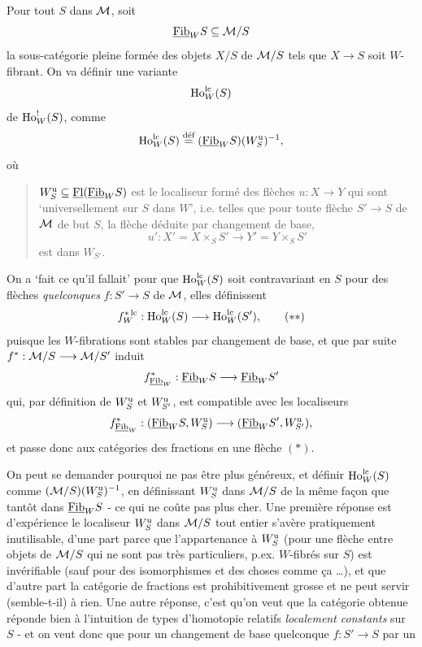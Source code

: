 Pour tout $S$ dans $\mathcal{M}$, soit
\[
\underline{\mathrm{Fib}}_W S \subseteq \mathcal{M}/S
\]
la sous-catégorie pleine formée des objets $X/S$ de $\mathcal{M}/S$ tels que $X \longrightarrow S$ soit $W$-fibrant. On va définir une variante
\[
\mathrm{Ho}^{\mathrm{lc}}_W(S)
\]
de $\mathrm{Ho}^!_W(S)$, comme
\[
\mathrm{Ho}^{\mathrm{lc}}_W(S) \overset{\text{déf}}{=} (\underline{\mathrm{Fib}}_W S)(W^{\mathrm{u}}_S)^{-1},
\]
où

\begin{quote}
$W^{\mathrm{u}}_S \subseteq \underline{\mathrm{Fl}}(\underline{\mathrm{Fib}}_W S)$ est le localiseur formé des flèches $u : X \longrightarrow Y$ qui sont ‘universellement sur $S$ dans $W$’, i.e. telles que pour toute flèche $S' \longrightarrow S$ de $\mathcal{M}$ de but $S$, la flèche déduite par changement de base,
\[
u' : X' = X \times_S S' \longrightarrow Y' = Y \times_S S'
\]
est dans $W_{S'}$.
\end{quote}

On a ‘fait ce qu'il fallait’ pour que $\mathrm{Ho}^{\mathrm{lc}}_W(S)$ soit contravariant en $S$ pour des flèches \textit{quelconques} $f : S' \longrightarrow S$ de $\mathcal{M}$, elles définissent
\[
f^{*\,\mathrm{lc}}_W : \mathrm{Ho}^{\mathrm{lc}}_W(S) \longrightarrow \mathrm{Ho}^{\mathrm{lc}}_W(S'), \tag*{$(**)$}
\]
puisque les $W$-fibrations sont stables par changement de base, et que par suite $f^* : \mathcal{M}/S \longrightarrow \mathcal{M}/S'$ induit
\[
f^*_{\underline{\mathrm{Fib}}_W} : \underline{\mathrm{Fib}}_W S \longrightarrow \underline{\mathrm{Fib}}_W S'
\]
qui, par définition de $W^{\mathrm{u}}_S$ et $W^{\mathrm{u}}_{S'}$, est compatible avec les localiseurs
\[
f^*_{\underline{\mathrm{Fib}}_W} : (\underline{\mathrm{Fib}}_W S, W^{\mathrm{u}}_S) \longrightarrow (\underline{\mathrm{Fib}}_W S', W^{\mathrm{u}}_{S'}),
\]
et passe donc aux catégories des fractions en une flèche $(*)$.

On peut se demander pourquoi ne pas être plus généreux, et définir $\mathrm{Ho}^{\mathrm{lc}}_W(S)$ comme $(\mathcal{M}/S)(W^{\mathrm{u}}_S)^{-1}$, en définissant $W^{\mathrm{u}}_S$ dans $\mathcal{M}/S$ de la même façon que tantôt dans $\underline{\mathrm{Fib}}_W S$ - ce qui ne coûte pas plus cher. Une première réponse est d'expérience le localiseur $W^{\mathrm{u}}_S$ dans $\mathcal{M}/S$ tout entier s'avère pratiquement inutilisable, d'une part parce que l'appartenance à $W^{\mathrm{u}}_S$ (pour une flèche entre objets de $\mathcal{M}/S$ qui ne sont pas très particuliers, p.ex. $W$-fibrés sur $S$) est invérifiable (sauf pour des isomorphismes et des choses comme ça \dots), et que d'autre part la catégorie de fractions est prohibitivement
grosse et ne peut servir (semble-t-il) à rien. Une autre réponse, c'est qu'on veut que la catégorie obtenue réponde bien à l'intuition de types d'homotopie relatifs \textit{localement constants} sur $S$ - et on veut donc que pour un changement de base quelconque $f : S' \longrightarrow S$ par un

